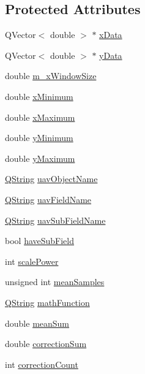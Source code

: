 \subsection*{\-Protected \-Attributes}
\begin{DoxyCompactItemize}
\item 
\-Q\-Vector$<$ double $>$ $\ast$ \hyperlink{group___scope_plugin_ga6232b3f635142b1b11f283491a01b719}{x\-Data}
\item 
\-Q\-Vector$<$ double $>$ $\ast$ \hyperlink{group___scope_plugin_ga0544d6bcbe24fc0bb460123547821457}{y\-Data}
\item 
double \hyperlink{group___scope_plugin_gaf008f7f617cf48b623abbd095e483e10}{m\-\_\-x\-Window\-Size}
\item 
double \hyperlink{group___scope_plugin_ga2115389376ac088ccc03fcb8a2279f8a}{x\-Minimum}
\item 
double \hyperlink{group___scope_plugin_ga8d380f3d20ca5102bd641b5475238da6}{x\-Maximum}
\item 
double \hyperlink{group___scope_plugin_gabb9422e4f6ced646443b98b6b4304957}{y\-Minimum}
\item 
double \hyperlink{group___scope_plugin_gaf9ae404a5b9a749189b4cba112eb5c18}{y\-Maximum}
\item 
\hyperlink{group___u_a_v_objects_plugin_gab9d252f49c333c94a72f97ce3105a32d}{\-Q\-String} \hyperlink{group___scope_plugin_ga409edd318f86291f5b46a673ff67e7fb}{uav\-Object\-Name}
\item 
\hyperlink{group___u_a_v_objects_plugin_gab9d252f49c333c94a72f97ce3105a32d}{\-Q\-String} \hyperlink{group___scope_plugin_ga3b137cdb062886f986237f8c9b527c22}{uav\-Field\-Name}
\item 
\hyperlink{group___u_a_v_objects_plugin_gab9d252f49c333c94a72f97ce3105a32d}{\-Q\-String} \hyperlink{group___scope_plugin_ga22ac4a688fa35def44e941b82b0a0b60}{uav\-Sub\-Field\-Name}
\item 
bool \hyperlink{group___scope_plugin_ga75814d7f770a1a8348f39dc7ca4bdb8f}{have\-Sub\-Field}
\item 
int \hyperlink{group___scope_plugin_gad4b115ab449c4276ef15d3e2862e6280}{scale\-Power}
\item 
unsigned int \hyperlink{group___scope_plugin_ga577111acdda17558321da13bff25a7c0}{mean\-Samples}
\item 
\hyperlink{group___u_a_v_objects_plugin_gab9d252f49c333c94a72f97ce3105a32d}{\-Q\-String} \hyperlink{group___scope_plugin_gaa8ea6880a7faa36947144d2df62d6642}{math\-Function}
\item 
double \hyperlink{group___scope_plugin_ga619dc668a50f1123f71de7baa4dc5f9c}{mean\-Sum}
\item 
double \hyperlink{group___scope_plugin_ga802021e218f3dadce03011cdeea7d90b}{correction\-Sum}
\item 
int \hyperlink{group___scope_plugin_ga85cd1767be2be06460ecbbd11b9ec366}{correction\-Count}
\end{DoxyCompactItemize}


